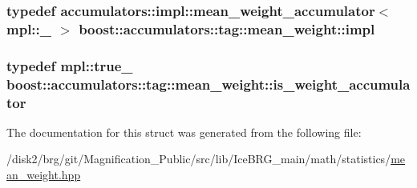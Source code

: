 \subsubsection[{impl}]{\setlength{\rightskip}{0pt plus 5cm}typedef {\bf accumulators\+::impl\+::mean\+\_\+weight\+\_\+accumulator}$<$ mpl\+::\+\_ $>$ {\bf boost\+::accumulators\+::tag\+::mean\+\_\+weight\+::impl}}\label{structboost_1_1accumulators_1_1tag_1_1mean__weight_a050aa975e9ff22bae68cb1b2d2ccb5d8}
\hypertarget{structboost_1_1accumulators_1_1tag_1_1mean__weight_a0eb6a612218600bcc4fd32f08cf9cc70}{}
\subsubsection[{is\+\_\+weight\+\_\+accumulator}]{\setlength{\rightskip}{0pt plus 5cm}typedef mpl\+::true\+\_\+ {\bf boost\+::accumulators\+::tag\+::mean\+\_\+weight\+::is\+\_\+weight\+\_\+accumulator}}\label{structboost_1_1accumulators_1_1tag_1_1mean__weight_a0eb6a612218600bcc4fd32f08cf9cc70}


The documentation for this struct was generated from the following file\+:\begin{DoxyCompactItemize}
\item 
/disk2/brg/git/\+Magnification\+\_\+\+Public/src/lib/\+Ice\+B\+R\+G\+\_\+main/math/statistics/\hyperlink{mean__weight_8hpp}{mean\+\_\+weight.\+hpp}\end{DoxyCompactItemize}
